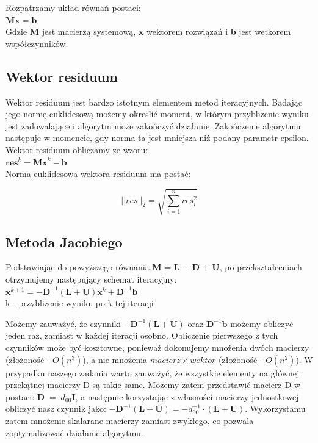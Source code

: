 \documentclass[fleqn]{article}
\begin{document}
    \noindent Rozpatrzamy układ równań postaci: \\

    $\bm{M}\bm{x} = \bm{b}$ \\

    \noindent Gdzie \textbf{M} jest macierzą systemową, \textbf{x} wektorem rozwiązań i \textbf{b} jest wetkorem współczynników.

    \subsection{Wektor residuum}
    Wektor residuum jest bardzo istotnym elementem metod iteracyjnych.
    Badając jego normę euklidesową możemy okreslić moment, w którym przybliżenie wyniku jest
    zadowalające i algorytm może zakończyć działanie. Zakończenie algorytmu następuje w momencie,
    gdy norma ta jest mniejsza niż podany parametr epsilon.\\
    \noindent Wektor residuum obliczamy ze wzoru: \\

    $\bm{res}^k = \bm{Mx}^k - \bm{b}$ \\

    \noindent Norma euklidesowa wektora residuum ma postać:

        \[ 
            || res ||_2 = \sqrt{ \sum_{i = 1}^{n} res_i^2} 
       \]


    \newpage
    \subsection{Metoda Jacobiego}

    Podstawiając do powyższego równania \textbf{M} = \textbf{L} + \textbf{D} + \textbf{U}, 
    po przekształceniach otrzymujemy następujący schemat iteracyjny: \\
    
    $\bm{x}^{k+1} = -\bm{D}^{-1}(\bm{L} + \bm{U})\bm{x}^k + \bm{D}^{-1}\bm{b}$ \\

    \noindent k - przybliżenie wyniku po k-tej iteracji

    \noindent Możemy zauważyć, że czynniki $-\bm{D}^{-1}(\bm{L} + \bm{U})$ oraz $\bm{D}^{-1}\bm{b}$
    możemy obliczyć jeden raz, zamiast w każdej iteracji osobno. Obliczenie pierwszego z tych czynników może być
    kosztowne, ponieważ dokonujemy mnożenia dwóch macierzy (złożoność - $O(n^3)$), 
    a nie mnożenia $macierz \times wektor$ (złożoność - $O(n^2)$). W przypadku naszego zadania warto zauważyć,
    że wszystkie elementy na głównej przekątnej macierzy D są takie same.
    Możemy zatem przedstawić macierz D w postaci: $\bm{D} \; = \; d_{00}\bm{I}$, a następnie korzystając z własności 
    macierzy jednostkowej obliczyć nasz czynnik jako: $-\bm{D}^{-1}(\bm{L} + \bm{U}) = -d^{-1}_{00} \cdot (\bm{L} + \bm{U})$.
    Wykorzystamu zatem mnożenie skalarane macierzy zamiast zwykłego, co pozwala
    zoptymalizować działanie algorytmu. \\ 
    
\end{document}
